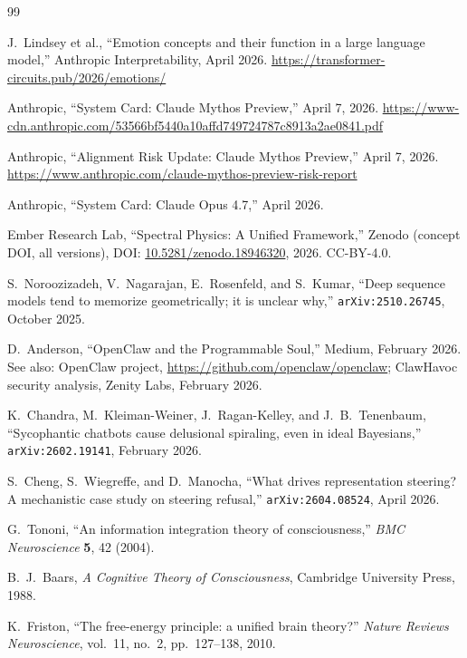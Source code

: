 \documentclass[11pt,letterpaper]{article}
\theoremstyle{remark}
\begin{document}
\begin{thebibliography}{99}

J.~Lindsey et al., ``Emotion concepts and their function in a large language model,'' Anthropic Interpretability, April 2026. \url{https://transformer-circuits.pub/2026/emotions/}

Anthropic, ``System Card: Claude Mythos Preview,'' April 7, 2026. \url{https://www-cdn.anthropic.com/53566bf5440a10affd749724787c8913a2ae0841.pdf}

Anthropic, ``Alignment Risk Update: Claude Mythos Preview,'' April 7, 2026. \url{https://www.anthropic.com/claude-mythos-preview-risk-report}

Anthropic, ``System Card: Claude Opus 4.7,'' April 2026.

Ember Research Lab, ``Spectral Physics: A Unified Framework,'' Zenodo (concept DOI, all versions), DOI: \href{https://doi.org/10.5281/zenodo.18946320}{10.5281/zenodo.18946320}, 2026. CC-BY-4.0.

S.~Noroozizadeh, V.~Nagarajan, E.~Rosenfeld, and S.~Kumar, ``Deep sequence models tend to memorize geometrically; it is unclear why,'' \texttt{arXiv:2510.26745}, October 2025.

D.~Anderson, ``OpenClaw and the Programmable Soul,'' Medium, February 2026. See also: OpenClaw project, \url{https://github.com/openclaw/openclaw}; ClawHavoc security analysis, Zenity Labs, February 2026.

K.~Chandra, M.~Kleiman-Weiner, J.~Ragan-Kelley, and J.~B.~Tenenbaum, ``Sycophantic chatbots cause delusional spiraling, even in ideal Bayesians,'' \texttt{arXiv:2602.19141}, February 2026.

S.~Cheng, S.~Wiegreffe, and D.~Manocha, ``What drives representation steering? A mechanistic case study on steering refusal,'' \texttt{arXiv:2604.08524}, April 2026.

G.~Tononi, ``An information integration theory of consciousness,'' \emph{BMC Neuroscience} \textbf{5}, 42 (2004).

B.~J.~Baars, \emph{A Cognitive Theory of Consciousness}, Cambridge University Press, 1988.

K.~Friston, ``The free-energy principle: a unified brain theory?'' \emph{Nature Reviews Neuroscience}, vol.~11, no.~2, pp.~127--138, 2010.


\end{thebibliography}
\end{document}
